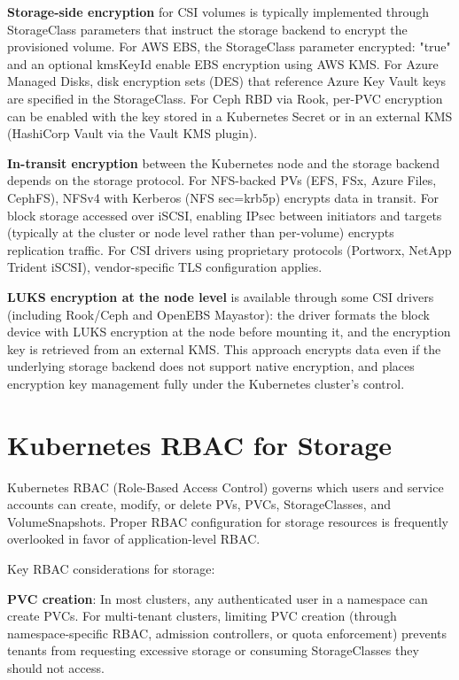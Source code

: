 \textbf{Storage-side encryption} for CSI volumes is typically implemented through StorageClass parameters that instruct the storage backend to encrypt the provisioned volume. For AWS EBS, the StorageClass parameter encrypted: "true" and an optional kmsKeyId enable EBS encryption using AWS KMS. For Azure Managed Disks, disk encryption sets (DES) that reference Azure Key Vault keys are specified in the StorageClass. For Ceph RBD via Rook, per-PVC encryption can be enabled with the key stored in a Kubernetes Secret or in an external KMS (HashiCorp Vault via the Vault KMS plugin).

\textbf{In-transit encryption} between the Kubernetes node and the storage backend depends on the storage protocol. For NFS-backed PVs (EFS, FSx, Azure Files, CephFS), NFSv4 with Kerberos (NFS sec=krb5p) encrypts data in transit. For block storage accessed over iSCSI, enabling IPsec between initiators and targets (typically at the cluster or node level rather than per-volume) encrypts replication traffic. For CSI drivers using proprietary protocols (Portworx, NetApp Trident iSCSI), vendor-specific TLS configuration applies.

\textbf{LUKS encryption at the node level} is available through some CSI drivers (including Rook/Ceph and OpenEBS Mayastor): the driver formats the block device with LUKS encryption at the node before mounting it, and the encryption key is retrieved from an external KMS. This approach encrypts data even if the underlying storage backend does not support native encryption, and places encryption key management fully under the Kubernetes cluster's control.

\section{Kubernetes RBAC for Storage}
Kubernetes RBAC (Role-Based Access Control) governs which users and service accounts can create, modify, or delete PVs, PVCs, StorageClasses, and VolumeSnapshots. Proper RBAC configuration for storage resources is frequently overlooked in favor of application-level RBAC.

Key RBAC considerations for storage:

\textbf{PVC creation}: In most clusters, any authenticated user in a namespace can create PVCs. For multi-tenant clusters, limiting PVC creation (through namespace-specific RBAC, admission controllers, or quota enforcement) prevents tenants from requesting excessive storage or consuming StorageClasses they should not access.

